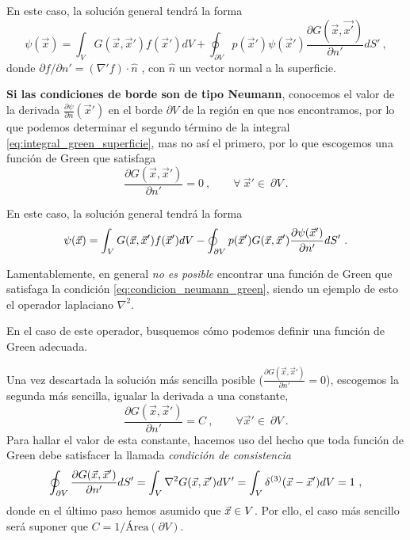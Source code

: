 En este caso, la solución general tendrá la forma
\begin{equation}
    \psi(\vec{x}) = \int_V G(\vec{x}, \vec{x}') f(\vec{x}') dV + \oint_{\partial V} p(\vec{x}') \psi(\vec{x}') \frac{\partial G(\vec{x}, \vec{x'})}{\partial n'} dS' \ ,
\end{equation}
donde $\partial f/\partial n' = (\nabla' f) \cdot \hat{n}$ , con $\hat{n}$ un vector normal a la superficie.

\textbf{Si las condiciones de borde son de tipo Neumann}, conocemos el valor de la derivada $\frac{\partial \psi}{\partial n}(\vec{x}')$ en el borde $\partial V$ de la región en que nos encontramos, por lo que podemos determinar el segundo término de la integral \eqref{eq:integral_green_superficie}, mas no así el primero, por lo que escogemos una función de Green que satisfaga
\begin{equation} \label{eq:condicion_neumann_green}
    \frac{\partial G(\vec{x}, \vec{x}')}{\partial n'} = 0 \ , \qquad \forall \ \vec{x}' \in \ \partial V \ .
\end{equation}

En este caso, la solución general tendrá la forma
\begin{equation}
    \psi(\vec{x}) = \int_V G(\vec{x}, \vec{x}') f(\vec{x}') dV - \oint_{\partial V} p(\vec{x} ') G(\vec{x}, \vec{x}') \frac{\partial \psi(\vec{x}')}{\partial n'} dS' \ .
\end{equation}

Lamentablemente, en general \emph{no es posible} encontrar una función de Green que satisfaga la condición \eqref{eq:condicion_neumann_green}, siendo un ejemplo de esto el operador laplaciano $\nabla^2$. 

En el caso de este operador, busquemos cómo podemos definir una función de Green adecuada.

Una vez descartada la solución más sencilla posible ($\frac{\partial G(\vec{x}, \vec{x}')}{\partial n'} = 0$), escogemos la segunda más sencilla, igualar la derivada a una constante,
\begin{equation}
    \frac{\partial G(\vec{x}, \vec{x}')}{\partial n'} = C \ , \qquad \forall \vec{x}' \in \ \partial V \ .
\end{equation}
Para hallar el valor de esta constante, hacemos uso del hecho que toda función de Green debe satisfacer la llamada \emph{condición de consistencia}
\begin{equation}
    \oint_{\partial V} \frac{\partial G(\vec{x}, \vec{x}')}{\partial n'} dS' = \int_V \nabla^2 G(\vec{x},\vec{x}') dV' = \int_V \delta^{(3)}(\vec{x} - \vec{x}') dV = 1 \ ,
\end{equation}
donde en el último paso hemos asumido que $\vec{x} \in V$. Por ello, el caso más sencillo será suponer que $C = 1/\text{Área}(\partial V)$.

